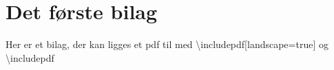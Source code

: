 \chapter{Det første bilag}
Her er et bilag, der kan ligges et pdf til med \textbackslash includepdf[landscape=true]{} og \textbackslash includepdf{}
